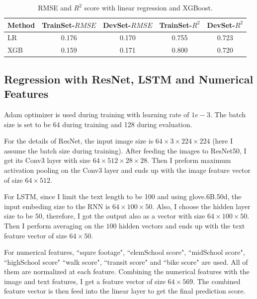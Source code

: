 \documentclass{article} %
\begin{document}
\begin{table}[h]
	\begin{center}
		\begin{tabular}{|l|cc|cc|}
			\hline
			 Method &
			TrainSet-$RMSE$ &
			DevSet-$RMSE$ &
			TrainSet-$R^2$ &
			DevSet-$R^2$ \\
			\hline
			LR & 0.176 & 0.170 & 0.755 & 0.723 \\
			\hline
			XGB & 0.159 & 0.171 & 0.800 & 0.720 \\
			\hline
		\end{tabular}
	\end{center}
	\caption{RMSE and $R^2$ score with linear regression and XGBoost.}
\end{table}

\subsection{Regression with ResNet, LSTM and Numerical Features}

Adam optimizer is used during training with learning rate of $1e-3$.
The batch size is set to be 64 during training and 128 during evaluation.

For the details of ResNet,
the input image size is $64 \times 3 \times 224 \times 224$ 
(here I assume the batch size during training).
After feeding the images to ResNet50,
I get its Conv3 layer with size $64 \times 512 \times 28 \times 28$.
Then I preform maximum activation pooling on the Conv3 layer
and ends up with the image feature vector of size $64 \times 512$.

For LSTM, since I limit the text length to be 100 and using glove.6B.50d,
the input embeding size to the RNN is  $64 \times 100 \times 50$.
 Also, I choose the hidden layer size to be $50$,
 therefore, I got the output also as a vector with size $64 \times 100 \times 50$.
 Then I perform averaging on the $100$ hidden vectors and ends up with the text
 feature vector of size $64 \times 50$.
 
 For numerical features,
 ``squre footage", ``elemSchool score", ``midSchool score", ``highSchool score"
 ``walk score", ``transit score" and ``bike score" are used.
 All of them are normalized at each feature.
 Combining the numerical features with the image and text features,
 I get a feature vector of size $64 \times 569$.
 The combined feature vector is then feed into the linear layer to get the final prediction score.
\end{document}
